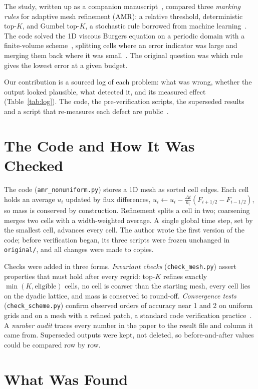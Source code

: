 \documentclass[conference]{IEEEtran}
\begin{document}
The study, written up as a companion
manuscript~\cite{amrpaper}, compared three \emph{marking rules} for
adaptive mesh refinement (AMR): a relative threshold, deterministic top-$K$,
and Gumbel top-$K$, a stochastic rule borrowed from machine
learning~\cite{kool2019}. The code solved the 1D viscous Burgers equation on
a periodic domain with a finite-volume scheme~\cite{leveque2002}, splitting
cells where an error indicator was large and merging them back where it was
small~\cite{berger1984}. The original question was which rule gives the
lowest error at a given budget.

Our contribution is a sourced log of each problem: what was wrong, whether
the output looked plausible, what detected it, and its measured effect
(Table~\ref{tab:log}). The code, the pre-verification scripts, the
superseded results and a script that re-measures each defect are public~\cite{repo}.

\section{The Code and How It Was Checked}
The code (\texttt{amr\_nonuniform.py}) stores a 1D mesh as sorted cell
edges. Each cell holds an average $u_i$ updated by flux differences,
$u_i \leftarrow u_i - \tfrac{\Delta t}{h_i}(F_{i+1/2}-F_{i-1/2})$, so mass
is conserved by construction. Refinement splits a cell in two; coarsening
merges two cells with a width-weighted average. A single global time step,
set by the smallest cell, advances every cell. The author wrote the first
version of the code; before verification began, its three scripts were
frozen unchanged in \texttt{original/}, and all changes were made to copies.

Checks were added in three forms. \emph{Invariant checks}
(\texttt{check\_mesh.py}) assert properties that must hold after every
regrid: top-$K$ refines exactly $\min(K,\text{eligible})$ cells, no cell is
coarser than the starting mesh, every cell lies on the dyadic lattice, and
mass is conserved to round-off. \emph{Convergence tests}
(\texttt{check\_scheme.py}) confirm observed orders of accuracy near 1 and 2
on uniform grids and on a mesh with a refined patch, a standard code
verification practice~\cite{roache1998,oberkampf2010}. A \emph{number audit}
traces every number in the paper to the result file and column it came from.
Superseded outputs were kept, not deleted, so before-and-after values could
be compared row by row.

\section{What Was Found}
\end{document}
